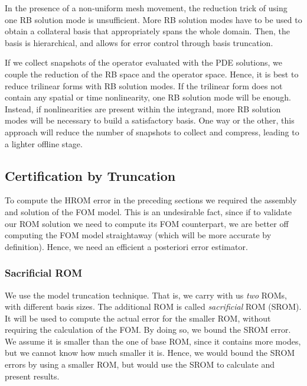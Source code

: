\documentclass[../../thesis.tex]{subfiles}
\begin{document}
In the presence of a non-uniform mesh movement,
the reduction trick of using one RB solution mode is unsufficient.
More RB solution modes have to be used to obtain 
a collateral basis that appropriately spans the whole domain.
Then, the basis is hierarchical, 
and allows for error control through basis truncation.

If we collect snapshots of the operator evaluated with the PDE solutions,
we couple the reduction of the RB space and the operator space.
Hence, it is best to reduce trilinear forms with RB solution modes.
If the trilinear form does not contain any spatial or time nonlinearity, 
one RB solution mode will be enough.
Instead, if nonlinearities are present within the integrand, more RB solution modes will be necessary 
to build a satisfactory basis.
One way or the other, this approach will reduce the number of snapshots to collect and compress,
leading to a lighter offline stage.

\newpage
\subsection{Certification by Truncation}
\label{sec:hrom_results_posteriori_error_estimation}
To compute the HROM error in the preceding sections
we required the assembly and solution of the FOM model.
This is an undesirable fact, since if to validate our ROM solution
we need to compute its FOM counterpart, 
we are better off computing the FOM model straightaway
(which will be more accurate by definition).
Hence, we need an efficient a posteriori error estimator.

\subsubsection{Sacrificial ROM}
We use the model truncation technique.
That is, we carry with us \textit{two} ROMs,
with different basis sizes.
The additional ROM is called \textit{sacrificial} ROM (SROM).
It will be used to compute the actual error for the smaller ROM,
without requiring the calculation of the FOM.
By doing so, we bound the SROM error.
We assume it is smaller than the one of base ROM, since it contains more modes,
but we cannot know how much smaller it is.
Hence, we would bound the SROM errors by using a smaller ROM, 
but would use the SROM to calculate and present results.
\end{document}
